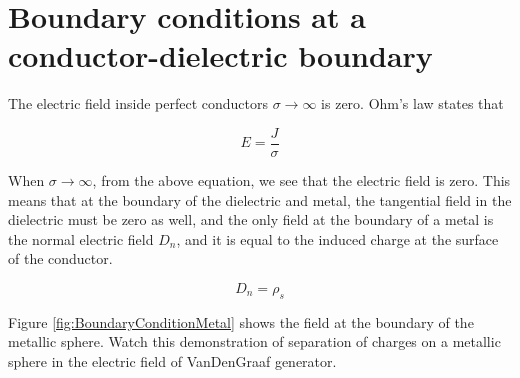 \documentclass{ximera}
\begin{document}
\section{Boundary conditions at a conductor-dielectric boundary}

The electric field inside perfect conductors $\sigma \rightarrow \infty$ is zero. Ohm's law states that 

\begin{equation}
E=\frac{J}{\sigma}
\end{equation}


When $\sigma \rightarrow \infty$, from the above equation, we see that the electric field is zero. This means that at the boundary of the dielectric and metal, the tangential field in the dielectric must be zero as well, and the only field at the boundary of a metal is the normal electric field $D_n$, and it is equal to the induced charge at the surface of the conductor.

\begin{equation}
D_n = \rho_s
\end{equation}

Figure \ref{fig:BoundaryConditionMetal} shows the field at the boundary of the metallic sphere. Watch this demonstration of separation of charges on a metallic sphere in the electric field of VanDenGraaf generator.


\begin{center}  
\end{center} 
\end{document}
